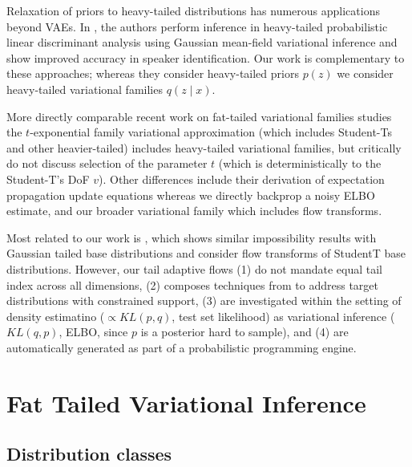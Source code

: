 \documentclass{scrartcl}
\theoremstyle{definition}
\begin{document}
Relaxation of priors to heavy-tailed distributions has numerous
applications beyond VAEs. In \cite{silnova2018fast}, the authors perform
inference in heavy-tailed probabilistic linear discriminant analysis
using Gaussian mean-field variational inference and show improved
accuracy in speaker identification. Our work is complementary to these approaches;
whereas they consider heavy-tailed priors $p(z)$ we consider heavy-tailed
variational families $q(z \mid x)$.

More directly comparable recent work on fat-tailed variational families
\cite{ding2011t,futami2017expectation} studies the $t$-exponential family
variational approximation (which includes Student-Ts and other
heavier-tailed) includes heavy-tailed variational families, but critically do
not discuss selection of the parameter $t$ (which is deterministically to the
Student-T's DoF $v$). Other differences include their derivation of
expectation propagation update equations whereas we directly backprop a noisy
ELBO estimate, and our broader variational family which includes flow
transforms.

Most related to our work is \cite{jaini2020tails}, which shows similar
impossibility results with Gaussian tailed base distributions and consider
flow transforms of StudentT base distributions. However, our tail adaptive
flows (1) do not mandate equal tail index across all dimensions, (2) composes
techniques from \cite{kucukelbir2017automatic} to address target
distributions with constrained support, (3) are investigated within the
setting of density estimatino ($\propto KL(p,q)$, test set likelihood) as
variational inference ($KL(q,p)$, ELBO, since $p$ is a posterior hard to
sample), and (4) are automatically generated as part of a probabilistic
programming engine.

\section{Fat Tailed Variational Inference}

\subsection{Distribution classes}
\end{document}
